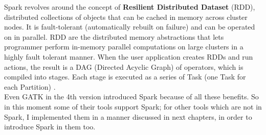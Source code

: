 Spark revolves around the concept of \textbf{Resilient Distributed Dataset} (RDD), distributed collections of objects that can be cached in memory
across cluster nodes. It is fault-tolerant (automatically rebuilt on failure) and can be operated on in parallel. RDD are the distributed memory abstractions that lets programmer perform in-memory parallel computations on large clusters in a highly fault tolerant manner.\newline
When the user application creates RDDs and run actions, the result is a DAG (Directed Acyclic Graph) of operators, which is compiled into stages. Each stage is executed as a series of Task (one Task for each Partition) \cite{Spark}.
\\[1\baselineskip]
Even GATK in the 4th version introduced Spark because of all these benefits. So in this moment some of their tools support Spark; for other tools which are not in Spark, I implemented them in a manner discussed in next chapters, in order to introduce Spark in them too.


